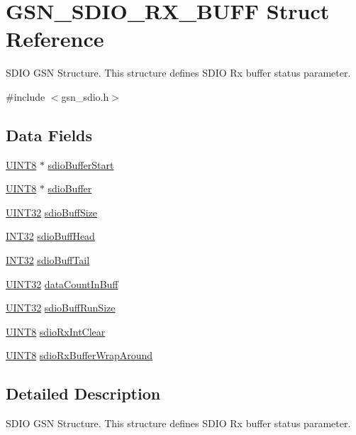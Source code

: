 \hypertarget{a00225}{
\section{GSN\_\-SDIO\_\-RX\_\-BUFF Struct Reference}
\label{a00225}
}


SDIO GSN Structure. This structure defines SDIO Rx buffer status parameter.  




{\ttfamily \#include $<$gsn\_\-sdio.h$>$}

\subsection*{Data Fields}
\begin{DoxyCompactItemize}
\item 
\hyperlink{a00660_gab27e9918b538ce9d8ca692479b375b6a}{UINT8} $\ast$ \hyperlink{a00225_a449e4955b6dc1e05ba6b00e90ba4221b}{sdioBufferStart}
\item 
\hyperlink{a00660_gab27e9918b538ce9d8ca692479b375b6a}{UINT8} $\ast$ \hyperlink{a00225_ad5497d2144c1e9439da107c0b98903e3}{sdioBuffer}
\item 
\hyperlink{a00660_gae1e6edbbc26d6fbc71a90190d0266018}{UINT32} \hyperlink{a00225_ad8a0bf8777517ff38b32e8a32c02b64d}{sdioBuffSize}
\item 
\hyperlink{a00660_ga63021d67d54286c2163bcdb43a6f2569}{INT32} \hyperlink{a00225_a1b050c7b46c786515a9ed7360b02bf6b}{sdioBuffHead}
\item 
\hyperlink{a00660_ga63021d67d54286c2163bcdb43a6f2569}{INT32} \hyperlink{a00225_afc8494dd3bf9dcef5fc5cd3f322094de}{sdioBuffTail}
\item 
\hyperlink{a00660_gae1e6edbbc26d6fbc71a90190d0266018}{UINT32} \hyperlink{a00225_a9e319c58ece6fc0adc5037cea451b24e}{dataCountInBuff}
\item 
\hyperlink{a00660_gae1e6edbbc26d6fbc71a90190d0266018}{UINT32} \hyperlink{a00225_aa11404063a1426961764af78dd2dce21}{sdioBuffRunSize}
\item 
\hyperlink{a00660_gab27e9918b538ce9d8ca692479b375b6a}{UINT8} \hyperlink{a00225_ab172bcd1d3f27a9679b0f42a91476917}{sdioRxIntClear}
\item 
\hyperlink{a00660_gab27e9918b538ce9d8ca692479b375b6a}{UINT8} \hyperlink{a00225_ae969f4ef854e8afc1b61acec9feac4d6}{sdioRxBufferWrapAround}
\end{DoxyCompactItemize}


\subsection{Detailed Description}
SDIO GSN Structure. This structure defines SDIO Rx buffer status parameter. 

